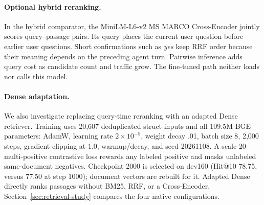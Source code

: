 \paragraph{Optional hybrid reranking.}
In the hybrid comparator, the MiniLM-L6-v2 MS MARCO Cross-Encoder jointly scores query--passage pairs. Its query places the current user question before earlier user questions. Short confirmations such as \emph{yes} keep RRF order because their meaning depends on the preceding agent turn. Pairwise inference adds query cost as candidate count and traffic grow. The fine-tuned path neither loads nor calls this model.

\paragraph{Dense adaptation.}
We also investigate replacing query-time reranking with an adapted Dense retriever. Training uses 20,607 deduplicated struct inputs and all 109.5M BGE parameters: AdamW, learning rate $2\!\times\!10^{-5}$, weight decay .01, batch size 8, 2,000 steps, gradient clipping at 1.0, warmup/decay, and seed 20261108. A scale-20 multi-positive contrastive loss rewards any labeled positive and masks unlabeled same-document negatives. Checkpoint 2000 is selected on dev160 (Hit@10 78.75, versus 77.50 at step 1000); document vectors are rebuilt for it. Adapted Dense directly ranks passages without BM25, RRF, or a Cross-Encoder. Section~\ref{sec:retrieval-study} compares the four native configurations.
